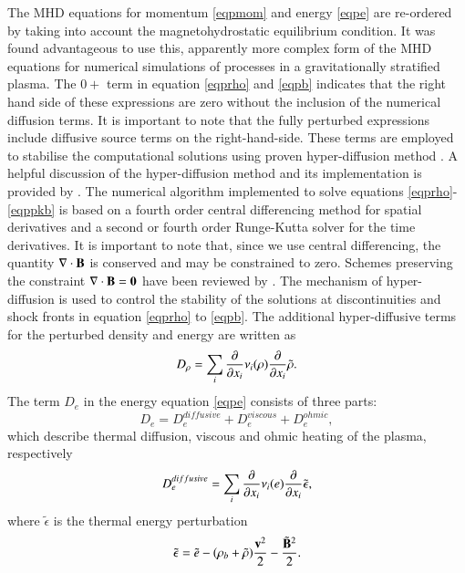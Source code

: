 \documentclass[final,1p]{elsarticle}
\begin{document}
The MHD equations for momentum \eqref{eqpmom} and energy \eqref{eqpe} are re-ordered by
taking into account the magnetohydrostatic equilibrium condition.  It was found advantageous to use
this, apparently more complex form of the MHD equations for numerical simulations of processes in a gravitationally stratified plasma. The $0+$ term in equation \eqref{eqprho} and  \eqref{eqpb} indicates that the right hand side of these expressions are zero without the inclusion of the numerical diffusion terms. It is important to note that the fully perturbed expressions include diffusive source terms on the right-hand-side. These terms are employed to stabilise the computational solutions using proven hyper-diffusion method \cite{Caunt2001, Stein1998}. A helpful discussion of the hyper-diffusion method and its implementation is provided by 
\cite{Sondergaard1999}.
 The numerical algorithm implemented to solve equations \eqref{eqprho}-\eqref{eqppkb} is based on a fourth order central differencing method for spatial derivatives and a second or fourth order Runge-Kutta solver for the time derivatives. It is important to note that, since we use central differencing, the  quantity $\nabla \cdot \bf B$ is conserved and may be constrained to zero. Schemes preserving the constraint $\nabla \cdot \bf B=0$ have been reviewed by 
\cite{Toth2000}. The mechanism of hyper-diffusion is used to control the stability of the solutions at discontinuities and shock fronts in equation  \eqref{eqprho} to  \eqref{eqpb}. The additional hyper-diffusive terms for the perturbed density and energy are written as
\begin{equation}\label{eqdifrho}
D_{\rho}=\sum _{i} {{\partial}\over{\partial x_{i}}}\nu _{i}(\rho) {{\partial}\over{\partial x_{i}}}\tilde{\rho}.
\end{equation}
The term $D_{e}$ in the energy equation \eqref{eqpe} consists of three parts:
\begin{equation}\label{eqdife}
D_{e}=D_{e}^{diffusive}+D_{e}^{viscous}+D_{e}^{ohmic},
\end{equation}
which describe thermal diffusion, viscous and ohmic heating of the plasma, respectively
\begin{equation}\label{eqdifedif}
D_{e}^{diffusive}=\sum _{i} {{\partial}\over{\partial x_{i}}}\nu _{i}(e) {{\partial}\over{\partial x_{i}}}\tilde{\epsilon},
\end{equation}
where $\tilde{\epsilon}$ is the thermal energy perturbation
\begin{equation}
\tilde{\epsilon}=\tilde{e}-(\rho_{b}+\tilde{\rho}){{{\bf v}^2}\over{2}}-{{\tilde{\bf B}^{2}}\over{2}}.
\end{equation}
\end{document}
